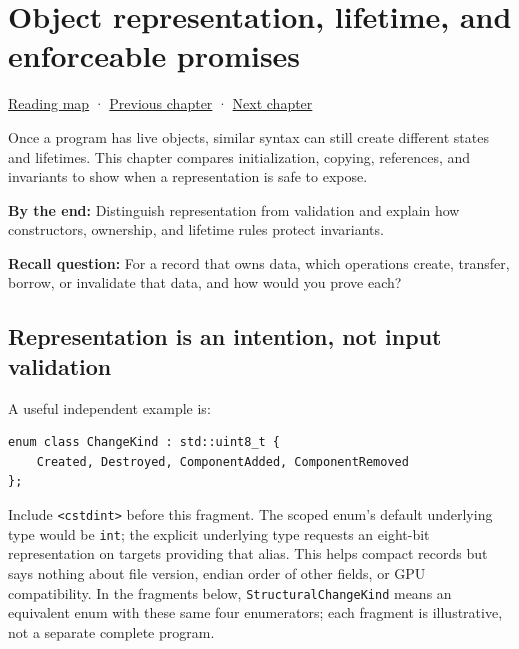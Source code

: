 \chapter{Object representation, lifetime, and enforceable promises}\label{05-engine-i-ch003-object-representation-lifetime-and-enforceable-promises}\hypertarget{05-engine-i-ch003}{}\label{stagechapter:05-engine-i-ch003}

\hyperref[volume-reading-map]{Reading map} · \hyperref[05-engine-i-ch002-how-bytes-become-programs-objects-and-resource-references]{Previous chapter} · \hyperref[05-engine-i-ch004-resource-ownership-failure-paths-and-review-practice]{Next chapter}

Once a program has live objects, similar syntax can still create different states and lifetimes. This chapter compares initialization, copying, references, and invariants to show when a representation is safe to expose.

\textbf{By the end:} Distinguish representation from validation and explain how constructors, ownership, and lifetime rules protect invariants.

\textbf{Recall question:} For a record that owns data, which operations create, transfer, borrow, or invalidate that data, and how would you prove each?

\section{Representation is an intention, not input validation}\label{05-engine-i-ch003-representation-is-an-intention-not-input-validation}

A useful independent example is:

\begin{verbatim}
enum class ChangeKind : std::uint8_t {
    Created, Destroyed, ComponentAdded, ComponentRemoved
};
\end{verbatim}

Include \texttt{\textless{}cstdint\textgreater{}} before this fragment. The scoped enum's default underlying type would be \texttt{int}; the explicit underlying type requests an eight-bit representation on targets providing that alias. This helps compact records but says nothing about file version, endian order of other fields, or GPU compatibility. In the fragments below, \texttt{StructuralChangeKind} means an equivalent enum with these same four enumerators; each fragment is illustrative, not a separate complete program.

